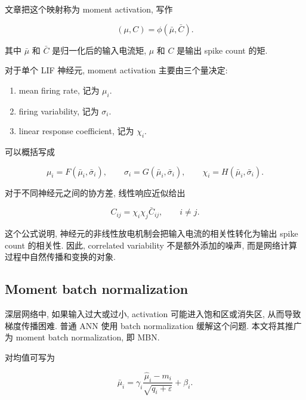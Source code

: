 \documentclass[oneside]{ctexart}
\begin{document}
文章把这个映射称为 moment activation, 写作

\begin{equation}
    (\mu,C)
    =
    \phi(\bar{\mu},\bar{C}).
\end{equation}

其中 $\bar{\mu}$ 和 $\bar{C}$ 是归一化后的输入电流矩, $\mu$ 和 $C$ 是输出 spike count 的矩.

对于单个 LIF 神经元, moment activation 主要由三个量决定:

\begin{enumerate}[(1)]
    \item mean firing rate, 记为 $\mu_i$.
    \item firing variability, 记为 $\sigma_i$.
    \item linear response coefficient, 记为 $\chi_i$.
\end{enumerate}

可以概括写成

\begin{equation}
    \mu_i=F(\bar{\mu}_i,\bar{\sigma}_i),
    \qquad
    \sigma_i=G(\bar{\mu}_i,\bar{\sigma}_i),
    \qquad
    \chi_i=H(\bar{\mu}_i,\bar{\sigma}_i).
\end{equation}

对于不同神经元之间的协方差, 线性响应近似给出

\begin{equation}
    C_{ij}
    =
    \chi_i\chi_j\bar{C}_{ij},
    \qquad i\neq j.
\end{equation}

这个公式说明, 神经元的非线性放电机制会把输入电流的相关性转化为输出 spike count 的相关性. 因此, correlated variability 不是额外添加的噪声, 而是网络计算过程中自然传播和变换的对象.

\subsection{Moment batch normalization}

深层网络中, 如果输入过大或过小, activation 可能进入饱和区或消失区, 从而导致梯度传播困难. 普通 ANN 使用 batch normalization 缓解这个问题. 本文将其推广为 moment batch normalization, 即 MBN.

对均值可写为

\begin{equation}
    \bar{\mu}_i
    =
    \gamma_i
    \dfrac{\hat{\mu}_i-m_i}{\sqrt{q_i+\varepsilon}}
    +
    \beta_i.
\end{equation}
\end{document}
